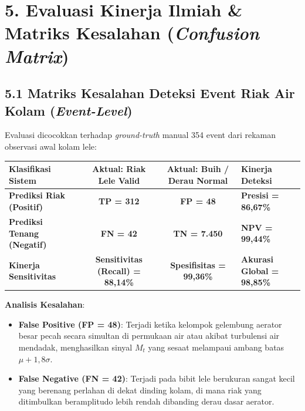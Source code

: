 \documentclass[10pt,a4paper]{article}
\begin{document}
\newpage

\section*{5. Evaluasi Kinerja Ilmiah \& Matriks Kesalahan (\textit{Confusion Matrix})}

\subsection*{5.1 Matriks Kesalahan Deteksi Event Riak Air Kolam (\textit{Event-Level})}
Evaluasi dicocokkan terhadap \textit{ground-truth} manual 354 event dari rekaman observasi awal kolam lele:

\begin{center}
\small
\begin{tabular}{|l|c|c|l|}
\hline
\textbf{Klasifikasi Sistem} & \textbf{Aktual: Riak Lele Valid} & \textbf{Aktual: Buih / Derau Normal} & \textbf{Kinerja Deteksi} \\
\hline
\textbf{Prediksi Riak (Positif)} & \textbf{TP = 312} & \textbf{FP = 48} & \textbf{Presisi = 86,67\%} \\
\hline
\textbf{Prediksi Tenang (Negatif)} & \textbf{FN = 42} & \textbf{TN = 7.450} & \textbf{NPV = 99,44\%} \\
\hline
\textbf{Kinerja Sensitivitas} & \textbf{Sensitivitas (Recall) = 88,14\%} & \textbf{Spesifisitas = 99,36\%} & \textbf{Akurasi Global = 98,85\%} \\
\hline
\end{tabular}
\end{center}

\textbf{Analisis Kesalahan}:
\begin{itemize}
  \item \textbf{False Positive (FP = 48)}: Terjadi ketika kelompok gelembung aerator besar pecah secara simultan di permukaan air atau akibat turbulensi air mendadak, menghasilkan sinyal $M_t$ yang sesaat melampaui ambang batas $\mu + 1,8\sigma$.
  \item \textbf{False Negative (FN = 42)}: Terjadi pada bibit lele berukuran sangat kecil yang berenang perlahan di dekat dinding kolam, di mana riak yang ditimbulkan beramplitudo lebih rendah dibanding derau dasar aerator.
\end{itemize}
\end{document}
